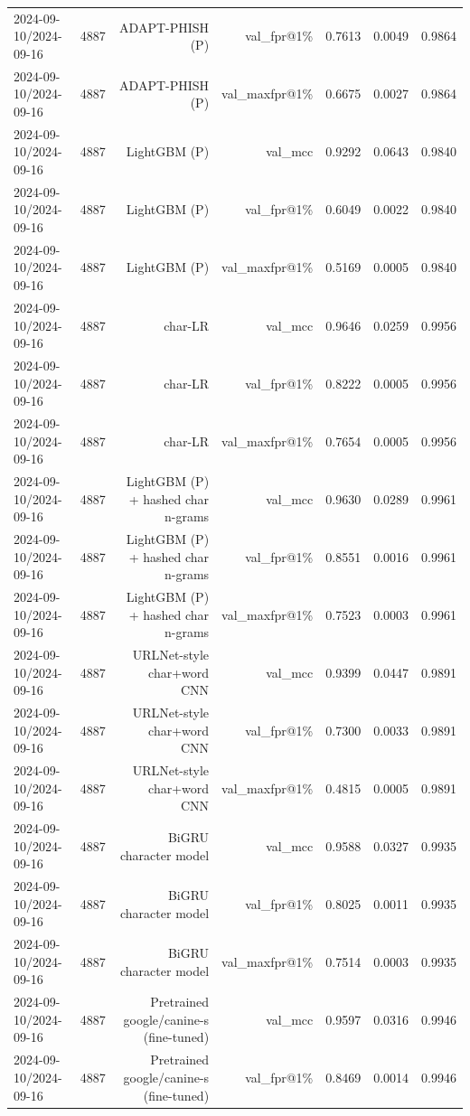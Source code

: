 \begin{table}[t]
\begin{tabular}{llrrrrr}
2024-09-10/2024-09-16 & 4887 & ADAPT-PHISH (P) & val\_fpr@1\% & 0.7613 & 0.0049 & 0.9864 \\
2024-09-10/2024-09-16 & 4887 & ADAPT-PHISH (P) & val\_maxfpr@1\% & 0.6675 & 0.0027 & 0.9864 \\
2024-09-10/2024-09-16 & 4887 & LightGBM (P) & val\_mcc & 0.9292 & 0.0643 & 0.9840 \\
2024-09-10/2024-09-16 & 4887 & LightGBM (P) & val\_fpr@1\% & 0.6049 & 0.0022 & 0.9840 \\
2024-09-10/2024-09-16 & 4887 & LightGBM (P) & val\_maxfpr@1\% & 0.5169 & 0.0005 & 0.9840 \\
2024-09-10/2024-09-16 & 4887 & char-LR & val\_mcc & 0.9646 & 0.0259 & 0.9956 \\
2024-09-10/2024-09-16 & 4887 & char-LR & val\_fpr@1\% & 0.8222 & 0.0005 & 0.9956 \\
2024-09-10/2024-09-16 & 4887 & char-LR & val\_maxfpr@1\% & 0.7654 & 0.0005 & 0.9956 \\
2024-09-10/2024-09-16 & 4887 & LightGBM (P) + hashed char n-grams & val\_mcc & 0.9630 & 0.0289 & 0.9961 \\
2024-09-10/2024-09-16 & 4887 & LightGBM (P) + hashed char n-grams & val\_fpr@1\% & 0.8551 & 0.0016 & 0.9961 \\
2024-09-10/2024-09-16 & 4887 & LightGBM (P) + hashed char n-grams & val\_maxfpr@1\% & 0.7523 & 0.0003 & 0.9961 \\
2024-09-10/2024-09-16 & 4887 & URLNet-style char+word CNN & val\_mcc & 0.9399 & 0.0447 & 0.9891 \\
2024-09-10/2024-09-16 & 4887 & URLNet-style char+word CNN & val\_fpr@1\% & 0.7300 & 0.0033 & 0.9891 \\
2024-09-10/2024-09-16 & 4887 & URLNet-style char+word CNN & val\_maxfpr@1\% & 0.4815 & 0.0005 & 0.9891 \\
2024-09-10/2024-09-16 & 4887 & BiGRU character model & val\_mcc & 0.9588 & 0.0327 & 0.9935 \\
2024-09-10/2024-09-16 & 4887 & BiGRU character model & val\_fpr@1\% & 0.8025 & 0.0011 & 0.9935 \\
2024-09-10/2024-09-16 & 4887 & BiGRU character model & val\_maxfpr@1\% & 0.7514 & 0.0003 & 0.9935 \\
2024-09-10/2024-09-16 & 4887 & Pretrained google/canine-s (fine-tuned) & val\_mcc & 0.9597 & 0.0316 & 0.9946 \\
2024-09-10/2024-09-16 & 4887 & Pretrained google/canine-s (fine-tuned) & val\_fpr@1\% & 0.8469 & 0.0014 & 0.9946 \\

\end{tabular}
\end{table}
